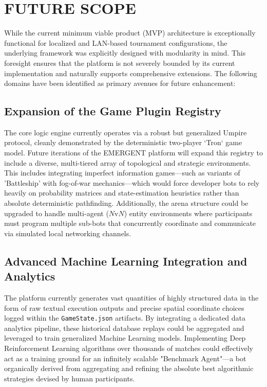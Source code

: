 \documentclass[12pt,a4paper]{report}
\begin{document}
\section{FUTURE SCOPE}
While the current minimum viable product (MVP) architecture is exceptionally functional for localized and LAN-based tournament configurations, the underlying framework was explicitly designed with modularity in mind. This foresight ensures that the platform is not severely bounded by its current implementation and naturally supports comprehensive extensions. The following domains have been identified as primary avenues for future enhancement:

\subsection{Expansion of the Game Plugin Registry}
The core logic engine currently operates via a robust but generalized Umpire protocol, cleanly demonstrated by the deterministic two-player `Tron` game model. Future iterations of the EMERGENT platform will expand this registry to include a diverse, multi-tiered array of topological and strategic environments. This includes integrating imperfect information games—such as variants of 'Battleship' with fog-of-war mechanics—which would force developer bots to rely heavily on probability matrices and state-estimation heuristics rather than absolute deterministic pathfinding. Additionally, the arena structure could be upgraded to handle multi-agent ($N\text{v}N$) entity environments where participants must program multiple sub-bots that concurrently coordinate and communicate via simulated local networking channels.

\subsection{Advanced Machine Learning Integration and Analytics}
The platform currently generates vast quantities of highly structured data in the form of raw textual execution outputs and precise spatial coordinate choices logged within the \texttt{GameState.json} artifacts. By integrating a dedicated data analytics pipeline, these historical database replays could be aggregated and leveraged to train generalized Machine Learning models. Implementing Deep Reinforcement Learning algorithms over thousands of matches could effectively act as a training ground for an infinitely scalable "Benchmark Agent"—a bot organically derived from aggregating and refining the absolute best algorithmic strategies devised by human participants.
\end{document}
